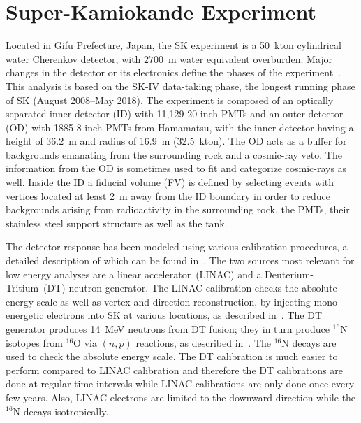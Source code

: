 \section{Super-Kamiokande Experiment}
\label{sec:SKdetector}

Located in Gifu Prefecture, Japan, the SK experiment is a 50~kton cylindrical water Cherenkov detector, with $2700$~m water equivalent overburden. Major changes in the detector or its electronics define the phases of the experiment~\cite{Super-Kamiokande:2002weg}. This analysis is based on the SK-IV data-taking phase, the longest running phase of SK (August 2008--May 2018). The experiment is composed of an optically separated inner detector (ID) with 11,129 20-inch PMTs and an outer detector (OD) with 1885 8-inch PMTs from Hamamatsu, with the inner detector having a height of 36.2~m and radius of 16.9~m (32.5~kton). The OD acts as a buffer for backgrounds emanating from the surrounding rock and a cosmic-ray veto. The information from the OD is sometimes used to fit and categorize cosmic-rays as well. Inside the ID a fiducial volume (FV) is defined by selecting events with vertices located at least 2~m away from the ID boundary in order to reduce backgrounds arising from radioactivity in the surrounding rock, the PMTs, their stainless steel support structure as well as the tank.

The detector response has been modeled using various calibration procedures, a detailed description of which can be found in~\cite{skcalib}. The two sources most relevant for low energy analyses are a linear accelerator~(LINAC) and a
Deuterium-Tritium~(DT) neutron generator. 
The LINAC calibration checks the absolute energy scale as well as vertex and direction reconstruction, by injecting mono-energetic electrons into SK at various locations, as described in~\cite{16Ncalibrationsource}. 
The DT generator produces 14~MeV neutrons from DT fusion; they in turn produce $^{16}$N isotopes from $\mathrm{^{16}O}$ via $(n, p)$ reactions, as described in~\cite{16Ncalibrationsource}. The $^{16}$N decays are used to check the absolute energy scale. The DT calibration is much easier to perform compared to LINAC calibration and therefore the DT calibrations are done at regular time intervals while LINAC calibrations are only done once every few years. Also, LINAC electrons are limited to the downward direction while the $^{16}$N decays isotropically.